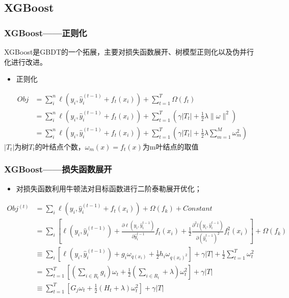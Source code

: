 \documentclass[usenames,dvipsnames]{beamer}
\begin{document}
\subsection{XGBoost}
\begin{frame}
\frametitle{XGBoost——正则化}
XGBoost是GBDT的一个拓展，主要对损失函数展开、树模型正则化以及伪并行化进行改进。
\begin{itemize}
  \item 正则化
\end{itemize}
\begin{align*}
          Obj & = \sum_{i}^{n}\ell(y_i, \hat{y}_i^{(t-1)}+f_t(x_i)) + \sum_{t=1}^{T}\Omega(f_t) \\
            & = \sum_{i}^{n}\ell(y_i, \hat{y}_i^{(t-1)}+f_t(x_i)) + \sum_{t=1}^{T}(\gamma |T_t|+\frac{1}{2}\lambda \|\omega\|^2)\\
            & = \sum_{i}^{n}\ell(y_i, \hat{y}_i^{(t-1)}+f_t(x_i)) + \sum_{t=1}^{T}(\gamma |T_t|+\frac{1}{2}\lambda \sum_{m=1}^{M}\omega_{m}^2)
\end{align*}
$|T_t|$为树$T_t$的叶结点个数，$\omega_m(x)=f_t(x)$为m叶结点的取值

\end{frame}
\begin{frame}
\frametitle{XGBoost——损失函数展开}
\begin{itemize}
  \item 对损失函数利用牛顿法对目标函数进行二阶泰勒展开优化；
\end{itemize}
\begin{align*}
  Obj^{(t)} & = \sum_{i}\ell(y_i, \hat{y}_i^{(t-1)}+f_t(x_i)) + \Omega(f_k) + Constant\\
            & = \sum_{i}[\ell(y_i, \hat{y}_i^{(t-1)}) + \frac{\partial \ell(y_i, \hat{y}_{i}^{t-1})}{\partial \hat{y}_{i}^{t-1}}f_t(x_i) +
                 \frac{1}{2}\frac{\partial^2 l(y_i, \hat{y}_{i}^{t-1})}{\partial (\hat{y}_{i}^{t-1})^2}f_t^2(x_i)] + \Omega(f_k)\\
            & \equiv \sum_{i}[\ell(y_i, \hat{y}_i^{(t-1)}) + g_i\omega_{q(x_i)}+\frac{1}{2}h_i\omega_{q(x_i)^2}]+
                \gamma|T|+\frac{1}{2}\sum_{t=1}^{T}\omega_t^{2}\\
            & = \sum_{t=1}^T[(\sum_{i\in R_t}g_i)\omega_t + \frac{1}{2}(\sum_{i\in R_t}+\lambda)\omega_t^2] + \gamma |T| \\
            & \equiv \sum_{t=1}^T[G_j\omega_t + \frac{1}{2}(H_t+\lambda)\omega_t^2] +\gamma |T|
\end{align*}
\end{frame}
\end{document}
